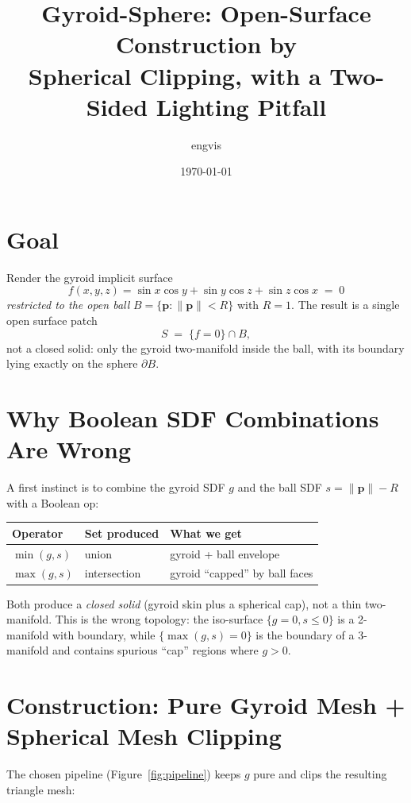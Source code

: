 \documentclass[11pt]{article}
\title{Gyroid-Sphere: Open-Surface Construction by\\
       Spherical Clipping, with a Two-Sided Lighting Pitfall}
\author{engvis}
\date{\today}
\begin{document}
\maketitle

\section{Goal}

Render the gyroid implicit surface
\[
  f(x,y,z)=\sin x\cos y+\sin y\cos z+\sin z\cos x \;=\; 0
\]
\emph{restricted to the open ball} $B = \{\mathbf{p}:\|\mathbf{p}\|<R\}$
with $R = 1$.  The result is a single open surface patch
\[
  S \;=\; \{f = 0\} \cap B,
\]
not a closed solid: only the gyroid two-manifold inside the ball, with
its boundary lying exactly on the sphere $\partial B$.

\section{Why Boolean SDF Combinations Are Wrong}

A first instinct is to combine the gyroid SDF $g$ and the ball SDF
$s = \|\mathbf{p}\| - R$ with a Boolean op:

\begin{table}[h]
  \centering
  \begin{tabular}{lll}
    \toprule
    Operator & Set produced & What we get \\
    \midrule
    $\min(g,s)$ & union  & gyroid + ball envelope \\
    $\max(g,s)$ & intersection & gyroid ``capped'' by ball faces \\
    \bottomrule
  \end{tabular}
\end{table}

Both produce a \emph{closed solid} (gyroid skin plus a spherical cap),
not a thin two-manifold.  This is the wrong topology: the iso-surface
$\{g=0, s\le 0\}$ is a 2-manifold with boundary, while
$\{\max(g,s)=0\}$ is the boundary of a 3-manifold and contains spurious
``cap'' regions where $g>0$.

\section{Construction: Pure Gyroid Mesh + Spherical Mesh Clipping}

The chosen pipeline (Figure~\ref{fig:pipeline}) keeps $g$ pure and clips
the resulting triangle mesh:
\end{document}
